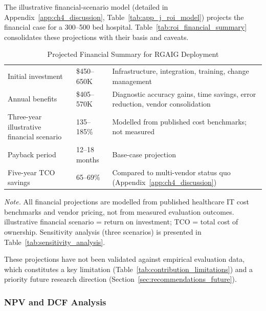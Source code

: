 \iffalse
The illustrative financial-scenario model (detailed in Appendix~\ref{app:ch4_discussion}, Table~\ref{tab:app_j_roi_model}) projects the financial case for a 300--500 bed hospital. Table~\ref{tab:roi_financial_summary} consolidates these projections with their basis and caveats.

\begin{table}[H]
\tablestripes
\caption{Projected Financial Summary for RGAIG Deployment}
\tablefontsize
\begin{tabularx}{\textwidth}{@{} p{3.5cm} p{3cm} L @{}}
\toprule
{} &  &  \\
\midrule
Initial investment & \$450--650K & Infrastructure, integration, training, change management \\
\addlinespace
Annual benefits & \$405--570K & Diagnostic accuracy gains, time savings, error reduction, vendor consolidation \\
\addlinespace
Three-year illustrative financial scenario & 135--185\% & Modelled from published cost benchmarks; not measured \\
\addlinespace
Payback period & 12--18 months & Base-case projection \\
\addlinespace
Five-year TCO savings & 65--69\% & Compared to multi-vendor status quo (Appendix~\ref{app:ch4_discussion}) \\
\bottomrule
\end{tabularx}
\vspace{0.5em}\noindent\textit{Note.} All financial projections are modelled from published healthcare IT cost benchmarks and vendor pricing, not from measured evaluation outcomes. illustrative financial scenario = return on investment; TCO = total cost of ownership. Sensitivity analysis (three scenarios) is presented in Table~\ref{tab:sensitivity_analysis}.
\end{table}

These projections have not been validated against empirical evaluation data, which constitutes a key limitation (Table~\ref{tab:contribution_limitations}) and a priority future research direction (Section~\ref{sec:recommendations_future}).

\subsubsection{NPV and DCF Analysis}

